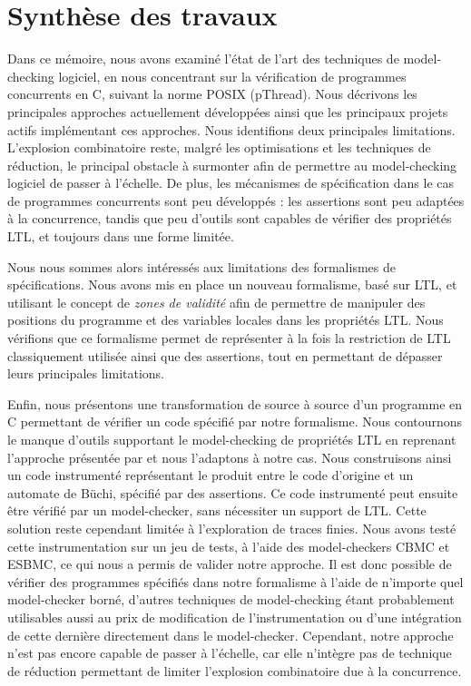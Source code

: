 \label{sec:Conclusion}

\section{Synthèse des travaux}

Dans ce mémoire, nous avons examiné l'état de l'art des techniques de
model-checking logiciel, en nous concentrant sur la vérification de programmes
concurrents en C, suivant la norme POSIX (pThread). Nous décrivons les
principales approches actuellement développées ainsi que les principaux projets
actifs implémentant ces approches. Nous identifions deux principales
limitations. L'explosion combinatoire reste, malgré les optimisations et les
techniques de réduction, le principal obstacle à surmonter afin de permettre au
model-checking logiciel de passer à l'échelle. De plus, les mécanismes de
spécification dans le cas de programmes concurrents sont peu développés : les
assertions sont peu adaptées à la concurrence, tandis que peu d'outils sont
capables de vérifier des propriétés \ac{LTL}, et toujours dans une forme
limitée.

Nous nous sommes alors intéressés aux limitations des formalismes de
spécifications. Nous avons mis en place un nouveau formalisme, basé sur
\ac{LTL}, et utilisant le concept de \emph{zones de validité} afin de permettre
de manipuler des positions du programme et des variables locales dans les
propriétés \ac{LTL}. Nous vérifions que ce formalisme permet de représenter à la
fois la restriction de \ac{LTL} classiquement utilisée ainsi que des assertions,
tout en permettant de dépasser leurs principales limitations.

Enfin, nous présentons une transformation de source à source d'un programme en C
permettant de vérifier un code spécifié par notre formalisme. Nous contournons
le manque d'outils supportant le model-checking de propriétés LTL en reprenant
l'approche présentée par \cite{morse_ltl} et nous l'adaptons à notre cas. Nous
construisons ainsi un code instrumenté représentant le produit entre le code
d'origine et un automate de Büchi, spécifié par des assertions. Ce code
instrumenté peut ensuite être vérifié par un model-checker, sans nécessiter un
support de LTL. Cette solution reste cependant limitée à l'exploration de traces
finies. Nous avons testé cette instrumentation sur un jeu de tests, à l'aide des
model-checkers CBMC et ESBMC, ce qui nous a permis de valider notre approche. Il
est donc possible de vérifier des programmes spécifiés dans notre formalisme à
l'aide de n'importe quel model-checker borné, d'autres techniques de
model-checking étant probablement utilisables aussi au prix de modification de
l'instrumentation ou d'une intégration de cette dernière directement dans le
model-checker. Cependant, notre approche n'est pas encore capable de passer à
l'échelle, car elle n'intègre pas de technique de réduction permettant de
limiter l'explosion combinatoire due à la concurrence.

